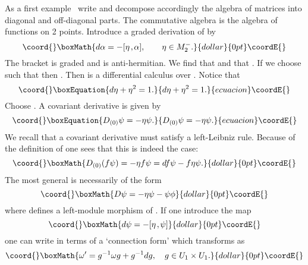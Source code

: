 \documentclass[a4paper,12pt]{article}
\def\b#1{{\mathbb #1}}
\def\k{\kern-.1em\mathbin{,}\kern-.1em}
\begin{document}
As a first example~\cite{ConLot90} write \myHighlight{$\b{C}^2 = \b{C}^1 \oplus \b{C}^1$}\coordHE{} 
and decompose accordingly the algebra of \coordHE{} matrices
\coordHE{} into diagonal and off-diagonal parts. The
commutative algebra \coordHE{} is the algebra of functions on 2 points.
Introduce a graded derivation \coordHE{} of \coordHE{} by
$$\coord{}\boxMath{
d \alpha = - [\eta \k \alpha], \qquad \eta \in M_2^-.
}{dollar}{0pt}\coordE{}$$
The bracket is graded and \myHighlight{$\eta$}\coordHE{} is anti-hermitian. We find that 
\coordHE{} and that \myHighlight{$ d^2 \alpha = [ \eta^2\k \alpha ]$}\coordHE{}. If we
choose \myHighlight{$\eta$}\coordHE{} such that \coordHE{} then \coordHE{}.  Then
\coordHE{} is a differential calculus over \coordHE{}. Notice that 
\begin{equation}\coord{}\boxEquation{
d \eta + \eta ^2 = 1.                                  \label{d-eta}
}{
d \eta + \eta ^2 = 1.                                  }{ecuacion}\coordE{}\end{equation}
Choose \coordHE{}. A covariant derivative is given by 
\begin{equation}\coord{}\boxEquation{
D_{(0)}\psi = - \eta \psi.                              \label{sec:1}
}{
D_{(0)}\psi = - \eta \psi.                              }{ecuacion}\coordE{}\end{equation}
We recall that a covariant derivative must satisfy a left-Leibniz
rule. Because of the definition of \coordHE{} one sees that this is indeed
the case:
$$\coord{}\boxMath{
D_{(0)} (f\psi) = - \eta f\psi = df \psi - f \eta \psi.
}{dollar}{0pt}\coordE{}$$
The most general \coordHE{} is necessarily of the form 
$$\coord{}\boxMath{
D \psi = - \eta \psi - \psi \phi
}{dollar}{0pt}\coordE{}$$
where \myHighlight{$\phi$}\coordHE{} defines a left-module morphism of \coordHE{}. If one introduce
the map
$$\coord{}\boxMath{
d\psi = - [\eta\k \psi]
}{dollar}{0pt}\coordE{}$$
one can write \coordHE{} in terms of a 
`connection form' \myHighlight{$\omega = \eta + \phi$}\coordHE{} which transforms as
$$\coord{}\boxMath{
\omega^\prime = g^{-1} \omega g + g^{-1} dg, \quad 
g  \in U_1 \times U_1.
}{dollar}{0pt}\coordE{}$$
\end{document}
